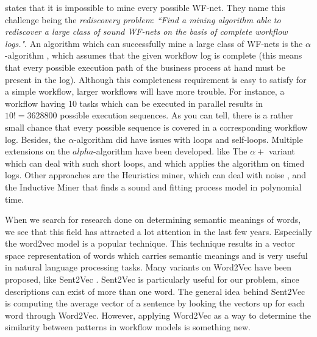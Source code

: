 \documentclass[a4paper,11pt]{article}
\begin{document}
\cite{VanDerAalst2002PetriNets} states that it is impossible to mine every possible WF-net. They name this challenge being the \textit{rediscovery problem}: \textit{``Find a mining algorithm able to rediscover a large class of sound WF-nets on the basis of complete workflow logs."}\cite{VanDerAalst2002PetriNets}. An algorithm which can successfully mine a large class of WF-nets is the $\alpha$-algorithm \cite{VanderAalst2003Survey,VanDerAalst2002PetriNets,VanderAalst2002TimedLogs}, which assumes that the given workflow log is complete (this means that every possible execution path of the business process at hand must be present in the log). Although this completeness requirement is easy to satisfy for a simple workflow, larger workflows will have more trouble. For instance, a workflow having 10 tasks which can be executed in parallel results in $10!=3628800$ possible execution sequences. As you can tell, there is a rather small chance that every possible sequence is covered in a corresponding workflow log. Besides, the $\alpha$-algorithm did have issues with loops and self-loops. Multiple extensions on the $alpha$-algorithm have been developed. like The $\alpha+$ variant \cite{A+-algorithm2004} which can deal with such short loops, and \cite{VanderAalst2002TimedLogs} which applies the algorithm on timed logs. Other approaches are the Heuristics miner, which can deal with noise \cite{HeuristicsMiner2006}, and the Inductive Miner \cite{InductiveMiner2013} that finds a sound and fitting process model in polynomial time.


When we search for research done on determining semantic meanings of words, we see that this field has attracted a lot attention in the last few years. Especially the word2vec model \cite{Mikolov2013aWord2Vec,Mikolov2013bWord2Vec} is a popular technique. This technique results in a vector space representation of words which carries semantic meanings and is very useful in natural language processing tasks. Many variants on Word2Vec have been proposed, like Sent2Vec \cite{Sent2Vec}. Sent2Vec is particularly useful for our problem, since descriptions can exist of more than one word. The general idea behind Sent2Vec is computing the average vector of a sentence by looking the vectors up for each word through Word2Vec. However, applying Word2Vec as a way to determine the similarity between patterns in workflow models is something new.
\end{document}
